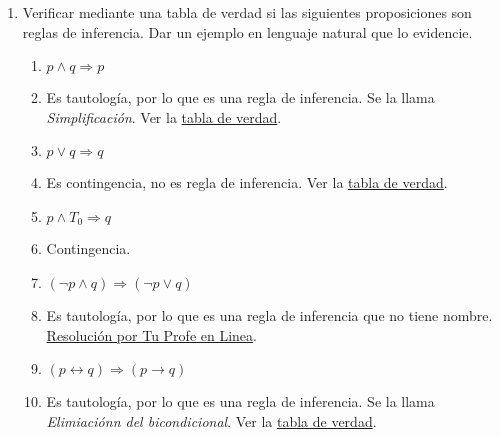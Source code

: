 \documentclass[a4paper]{article}
\newcommand{\answer}{\item[**]}
\newcommand{\exercise}{\item}
\newcommand{\then}{\to}
\newcommand{\eq}{\leftrightarrow}
\newcommand{\xor}{\veebar}
\newcommand{\nand}{\uparrow}
\newcommand{\Then}{\Rightarrow}
\begin{document}
\begin{enumerate}
\begin{multicols}{2}
\begin{enumerate} [label=(\alph*)]
		\item $p\xor q$
		\answer DNF: $(p\land \neg q) \lor  (\neg p\land q)$ \\ CNF: $(p\lor q) \land  (\neg p\lor \neg q)$

		\item $\neg (p \nand q) \lor \neg p$
		\answer DNF: $(p\land \neg q)$  \\ CNF: $(\neg p\lor \neg q) \land  (p\lor q) \land  (p\lor \neg q)$
		
		\item $p\then  (q\land r)$
		\answer DNF: $(p\land q\land r) \lor  (\neg p\land q\land r) \lor  (\neg p\land q\land \neg r) \lor  (\neg p\land \neg q\land r) \lor  (\neg p\land \neg q\land \neg r)$  \\ CNF: $(\neg p\lor \neg q\lor r) \land  (\neg p\lor q\lor \neg r) \land  (\neg p\lor q\lor r)$

	\end{enumerate}
	\end{multicols}


	\exercise Verificar mediante una tabla de verdad si las siguientes proposiciones son reglas de inferencia. Dar un ejemplo en lenguaje natural que lo evidencie.
	\begin{multicols}{2}
	\begin{enumerate} [label=(\alph*)]

		\item $p \land q \Then p$
		\answer Es tautología, por lo que es una regla de inferencia. Se la llama \textit{Simplificación}. Ver la \href{https://www.wolframalpha.com/input?i=%28p+and+q%29+%3D%3E+p}{tabla de verdad}.

		\item $p\lor q \Then  q$
		\answer Es contingencia, no es regla de inferencia. Ver la \href{https://www.wolframalpha.com/input?i=%28p+or+q%29+%3D%3E+q}{tabla de verdad}.

		\item $p \land  T_0 \Then  q$
		\answer Contingencia.

		\item $(\neg p \land q) \Then (\neg p \lor q)$
		\answer Es tautología, por lo que es una regla de inferencia que no tiene nombre. \href{https://youtu.be/NZSuHeymu4M?t=382}{Resolución por Tu Profe en Linea}.

		\item $(p\eq q) \Then  (p\then q)$
		\answer Es tautología, por lo que es una regla de inferencia. Se la llama \textit{Elimiaciónn del bicondicional}. Ver la \href{https://www.wolframalpha.com/input?i=%28p%3C%3D%3Eq%29+%3D%3E+%28p%3D%3Eq%29}{tabla de verdad}.


\end{enumerate}
\end{multicols}
\end{enumerate}
\end{document}
